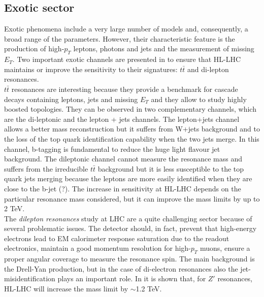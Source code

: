 \documentclass[a4paper,twoside,12pt]{article}
\begin{document}
\subsection{Exotic sector}
Exotic phenomena include a very large number of models and, consequently, a broad
range of the parameters. However, their characteristic feature is the production of high-$p_T$ 
leptons, photons and jets and the measurement of missing $E_T$. Two important exotic
channels are presented in \cite{loi} to ensure that HL-LHC maintains or improve the
sensitivity to their signatures: $t\bar{t}$ and di-lepton resonances.\\

$t\bar{t}$ resonances are interesting because they provide a benchmark for cascade
decays containing leptons, jets and missing $E_T$ and they allow to study highly boosted
topologies. They can be observed in two complementary channels, which are the di-leptonic and the lepton + jets channels.  The lepton+jets channel allows a better mass reconstruction but it suffers
from W+jets background and to the loss of the top quark identification capability when the two jets merge. In this channel, b-tagging is fundamental to reduce the huge light flavour jet
background. The dileptonic channel cannot measure the resonance mass and suffers from the irreducible $t\bar{t}$ background but
it is less susceptible to the top quark jets merging because the leptons are more easily 
identified when they are close to the b-jet (?).  The increase in sensitivity at HL-LHC depends
on the particular resonance mass considered, but it can improve the mass limits by up to
2 TeV.\\

The \textit{dilepton resonances} study at LHC are a quite challenging sector because of
several problematic issues. The detector should, in fact, prevent that high-energy electrons lead to EM calorimeter
response saturation due to the readout electronics, maintain a good momentum resolution for high-$p_T$ muons, ensure a proper angular coverage to measure the resonance spin. The main background is the Drell-Yan production, but in the 
case of di-electron resonances also the jet-misidentification plays an important role. In \cite{loi}
it is shown that, for $Z'$ resonances, HL-LHC will increase the mass limit by $\sim$1.2 TeV.
\end{document}
